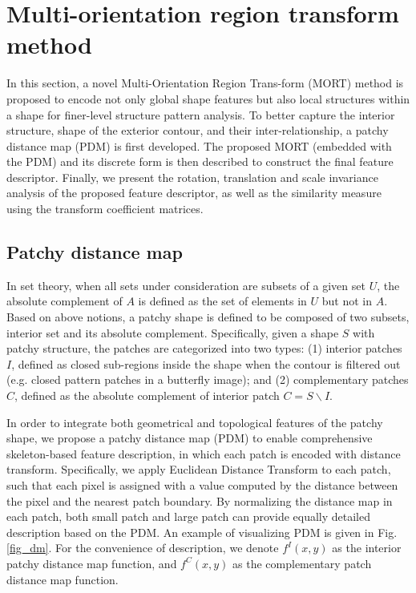 \documentclass[letterpaper]{article} %
\begin{document}
\section{Multi-orientation region transform method}

In this section, a novel Multi-Orientation Region Trans-form (MORT) method is proposed to encode not only global shape features but also local structures within a shape for finer-level structure pattern analysis. To better capture the interior structure, shape of the exterior contour, and their inter-relationship, a patchy distance map (PDM) is first developed. The proposed MORT (embedded with the PDM) and its discrete form is then described to construct the final feature descriptor. Finally, we present the rotation, translation and scale invariance analysis of the proposed feature descriptor, as well as the similarity measure using the transform coefficient matrices.

\subsection{Patchy distance map}
In set theory, when all sets under consideration are subsets of a given set $U$, the absolute complement of $A$ is defined as the set of elements in $U$ but not in $A$. Based on above notions, a patchy shape is defined to be composed of two subsets, interior set and its absolute complement. Specifically, given a shape $S$ with patchy structure, the patches are categorized into two types: (1) interior patches $I$, defined as closed sub-regions inside the shape when the contour is filtered out (e.g. closed pattern patches in a butterfly image); and (2) complementary patches $C$, defined as the absolute complement of interior patch $C=S \backslash I$.

In order to integrate both geometrical and topological features of the patchy shape, we propose a patchy distance map (PDM) to enable comprehensive skeleton-based feature description, in which each patch is encoded with distance transform. Specifically, we apply Euclidean Distance Transform \cite{12} to each patch, such that each pixel is assigned with a value computed by the distance between the pixel and the nearest patch boundary. By normalizing the distance map in each patch, both small patch and large patch can provide equally detailed description based on the PDM. An example of visualizing PDM is given in Fig. \ref{fig_dm}. For the convenience of description, we denote $f^I (x,y)$ as the interior patchy distance map function, and $f^C (x,y)$ as the complementary patch distance map function.
\end{document}
